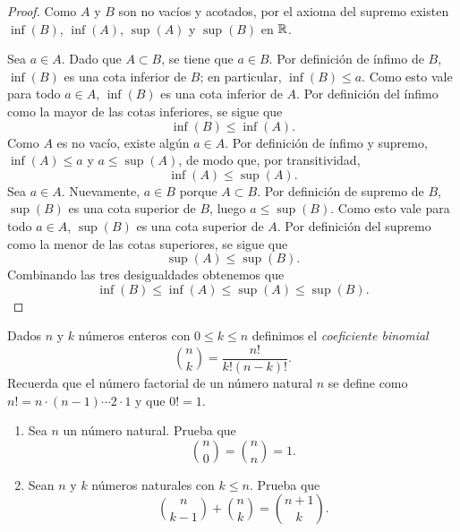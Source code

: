\documentclass[12pt,a4paper]{article}
\begin{document}
    \begin{proof}
        Como $A$ y $B$ son no vacíos y acotados, por el axioma del supremo existen $\inf(B)$, $\inf(A)$, $\sup(A)$ y $\sup(B)$ en $\mathbb{R}$.

        Sea $a\in A$. Dado que $A\subset B$, se tiene que $a\in B$. Por definición de ínfimo de $B$, $\inf(B)$ es una cota inferior de $B$; en particular, $\inf(B)\leq a$. Como esto vale para todo $a\in A$, $\inf(B)$ es una cota inferior de $A$. Por definición del ínfimo como la mayor de las cotas inferiores, se sigue que
        \begin{equation*}
            \inf(B)\leq\inf(A).
        \end{equation*}
        Como $A$ es no vacío, existe algún $a\in A$. Por definición de ínfimo y supremo, $\inf(A)\leq a$ y $a\leq\sup(A)$, de modo que, por transitividad,
        \begin{equation*}
            \inf(A)\leq\sup(A).
        \end{equation*}
        Sea $a\in A$. Nuevamente, $a\in B$ porque $A\subset B$. Por definición de supremo de $B$, $\sup(B)$ es una cota superior de $B$, luego $a\leq\sup(B)$. Como esto vale para todo $a\in A$, $\sup(B)$ es una cota superior de $A$. Por definición del supremo como la menor de las cotas superiores, se sigue que
        \begin{equation*}
            \sup(A)\leq\sup(B).
        \end{equation*}
        Combinando las tres desigualdades obtenemos que
        \begin{equation*}
            \inf(B)\leq\inf(A)\leq\sup(A)\leq\sup(B).
        \end{equation*}
    \end{proof}

    \begin{problema}
        Dados $n$ y $k$ números enteros
        con $0\leq k\leq n$ definimos el \textit{coeficiente binomial} 
        \begin{equation*}
            \binom{n}{k}=\frac{n!}{k!(n-k)!}.
        \end{equation*}
        Recuerda que el número factorial de un número natural $n$ se define
        como $n!=n\cdot\left(n-1\right)\cdots2\cdot1$ y que $0!=1.$ 
        \begin{enumerate}
            \item[(a)]  Sea $n$ un número natural. Prueba que 
            \begin{equation*}
                \binom{n}{0}=\binom{n}{n}=1.
            \end{equation*}
            \item[(b)]  Sean $n$ y $k$ números naturales con $k\leq n.$ Prueba que 
            \begin{equation*}
                \binom{n}{k-1}+\binom{n}{k}=\binom{n+1}{k}.
            \end{equation*}
        \end{enumerate}
    \end{problema}
\end{document}
